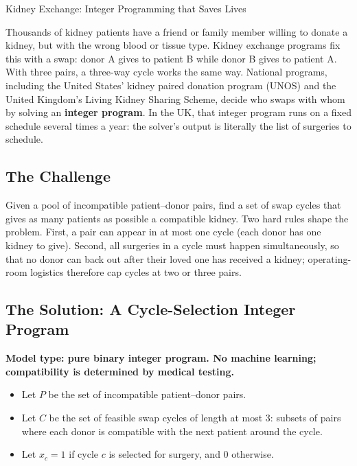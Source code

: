 \begin{casestudybox}{Kidney Exchange: Integer Programming that Saves Lives}
\label{case:kidney-exchange}

Thousands of kidney patients have a friend or family member willing to donate a kidney, but with the wrong blood or tissue type.  Kidney exchange programs fix this with a swap: donor A gives to patient B while donor B gives to patient A.  With three pairs, a three-way cycle works the same way.  National programs, including the United States' kidney paired donation program (UNOS) and the United Kingdom's Living Kidney Sharing Scheme, decide who swaps with whom by solving an \textbf{integer program}.  In the UK, that integer program runs on a fixed schedule several times a year: the solver's output is literally the list of surgeries to schedule.

\subsection*{The Challenge}
Given a pool of incompatible patient--donor pairs, find a set of swap cycles that gives as many patients as possible a compatible kidney.  Two hard rules shape the problem.  First, a pair can appear in at most one cycle (each donor has one kidney to give).  Second, all surgeries in a cycle must happen simultaneously, so that no donor can back out after their loved one has received a kidney; operating-room logistics therefore cap cycles at two or three pairs.

\subsection*{The Solution: A Cycle-Selection Integer Program}
\textbf{Model type: pure binary integer program.  No machine learning; compatibility is determined by medical testing.}

\begin{itemize}
\item Let $P$ be the set of incompatible patient--donor pairs.
\item Let $C$ be the set of feasible swap cycles of length at most 3: subsets of pairs where each donor is compatible with the next patient around the cycle.
\end{itemize}

\begin{itemize}
\item Let $x_c = 1$ if cycle $c$ is selected for surgery, and $0$ otherwise.
\end{itemize}


\end{casestudybox}
